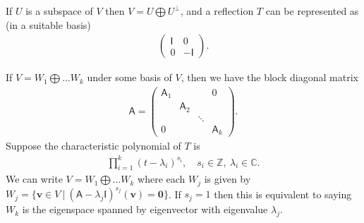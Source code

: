\documentclass[letter-paper]{tufte-book}
\newenvironment{example}[1][Example]{\begin{trivlist}
\item[\hskip \labelsep {\bfseries #1}]}{\end{trivlist}}
\newcommand{\As}{{\mathsf{A}}}
\newcommand{\Is}{{\mathsf{I}}}
\newcommand{\Ob}{{\boldsymbol{0}}}
\newcommand{\vb}{{\boldsymbol{v}}}
\begin{document}
\begin{example}
  If $U$ is a subspace of $V$ then $V = U \bigoplus U^\perp$, and a reflection $T$ can be represented as (in a suitable basis)
  \begin{align*}
    \begin{pmatrix} \Is & 0 \\ 0 & -\Is \end{pmatrix}.
  \end{align*}
\end{example}

If $V = W_1 \bigoplus \ldots W_k$ under some basis of $V$, then we have the block diagonal matrix
\begin{align*}
  \As = \begin{pmatrix}\As_1 &  &  & 0 \\  & \As_2 & & \\ & & \ddots & \\ 0 & & & \As_k \end{pmatrix}.
\end{align*}
Suppose the characteristic polynomial of $T$ is
\begin{align*}
  \prod_{i=1}^k (t - \lambda_i)^{s_i}, \quad s_i \in \mathbb{Z},\ \lambda_i \in \mathbb{C}.
\end{align*}
We can write $V = W_1 \bigoplus \ldots W_k$ where each $W_j$ is given by $W_j = \{\vb \in V\ |\ (\As - \lambda_j \Is)^{s_j}(\vb) = \Ob\}$. If $s_j=1$ then this is equivalent to saying $W_k$ is the eigenspace spanned by eigenvector with eigenvalue $\lambda_j$.
\end{document}

